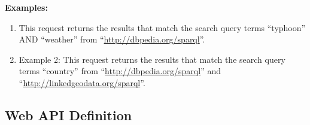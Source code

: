 \documentclass[letterpaper,10pt,english]{sphinxmanual}
\begin{document}
\textbf{Examples:}
\begin{enumerate}
\item {} 
This request returns the results that match the search query terms ``typhoon'' AND ``weather'' from ``\href{http://dbpedia.org/sparql}{http://dbpedia.org/sparql}''.

\item {} 
Example 2: This request returns the results that match the search query terms ``country'' from ``\href{http://dbpedia.org/sparql}{http://dbpedia.org/sparql}'' and ``\href{http://linkedgeodata.org/sparql}{http://linkedgeodata.org/sparql}''.

\end{enumerate}
\begin{figure}[htbp]
\centering

\end{figure}


\subsection{Web API Definition}
\label{docs/uss:web-api-definition}
\end{document}

